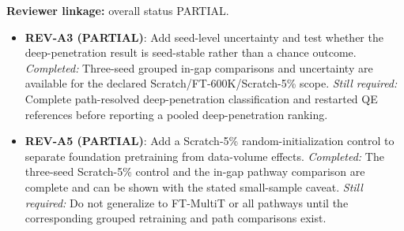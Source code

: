 \textbf{Reviewer linkage:} overall status PARTIAL.
\begin{itemize}[leftmargin=1.4em,noitemsep]
\item \textbf{REV-A3 (PARTIAL)}: Add seed-level uncertainty and test whether the deep-penetration result is seed-stable rather than a chance outcome. \emph{Completed:} Three-seed grouped in-gap comparisons and uncertainty are available for the declared Scratch/FT-600K/Scratch-5\% scope. \emph{Still required:} Complete path-resolved deep-penetration classification and restarted QE references before reporting a pooled deep-penetration ranking.
\item \textbf{REV-A5 (PARTIAL)}: Add a Scratch-5\% random-initialization control to separate foundation pretraining from data-volume effects. \emph{Completed:} The three-seed Scratch-5\% control and the in-gap pathway comparison are complete and can be shown with the stated small-sample caveat. \emph{Still required:} Do not generalize to FT-MultiT or all pathways until the corresponding grouped retraining and path comparisons exist.
\end{itemize}
